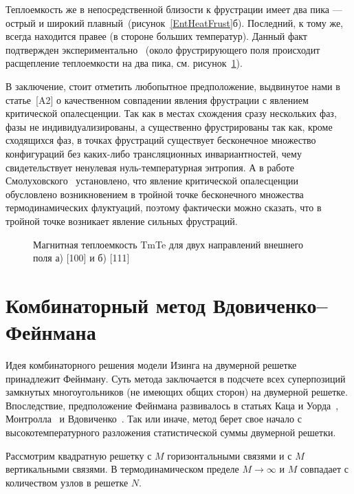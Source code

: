Теплоемкость же в непосредственной близости к фрустрации имеет два пика --- острый и широкий плавный~(рисунок~\ref{EntHeatFrust}б). Последний, к тому же, всегда находится правее (в стороне больших температур). Данный факт подтвержден экспериментально~\cite{matsumura1997} (около фрустрирующего поля происходит расщепление теплоемкости на два пика, см. рисунок~\ref{new1}). 

В заключение, стоит отметить любопытное предположение, выдвинутое нами в  статье~[A2] о качественном совпадении явления фрустрации с явлением критической опалесценции. Так как в местах схождения сразу нескольких фаз, фазы не индивидуализированы, а существенно фрустрированы так как, кроме сходящихся фаз, в точках фрустраций существует бесконечное множество конфигураций без каких-либо трансляционных инвариантностей, чему свидетельствует ненулевая нуль-температурная энтропия. А в работе Смолуховского~\cite{smoluchowski1907} установлено, что явление критической опалесценции обусловлено возникновением в тройной точке бесконечного множества термодинамических флуктуаций, поэтому фактически можно сказать, что в тройной точке возникает явление сильных фрустраций.

 \begin{figure}[h]
 	\caption{Магнитная теплоемкость TmTe для двух направлений внешнего поля а) [100] и б) [111]~\cite{matsumura1997}}
 	\label{new1}
 \end{figure}

\section{Комбинаторный метод Вдовиченко--Фейнмана}\label{sec:markup}

Идея комбинаторного решения модели Изинга на двумерной решетке принадлежит Фейнману. Суть метода заключается в подсчете всех суперпозиций замкнутых многоугольников (не имеющих общих сторон) на двумерной решетке. Впоследствие, предположение Фейнмана развивалось в статьях Каца и Уорда~\cite{kac1952}, Монтролла~\cite{montroll1953} и Вдовиченко~\cite{vdovichenko1965_1}. Так или иначе, метод берет свое начало с высокотемпературного разложения статистической суммы двумерной решетки. 

Рассмотрим квадратную решетку с $M$ горизонтальными связями и с $M$ вертикальными связями. В термодинамическом пределе $M \rightarrow \infty$ и $M$ совпадает с количеством узлов в решетке $N$. 

